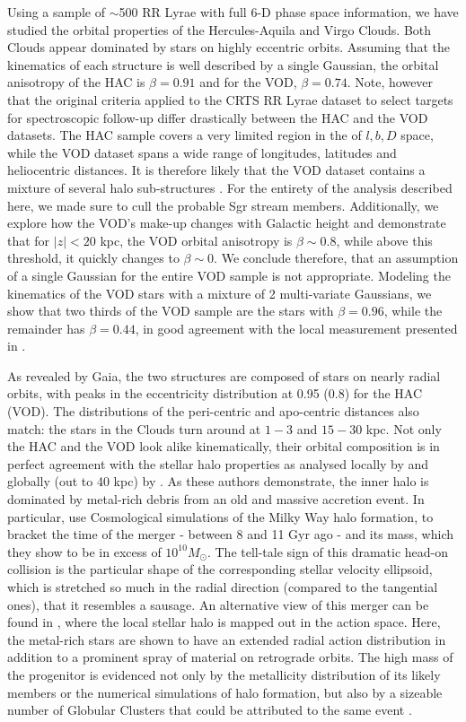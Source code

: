 \documentclass[fleqn,usenatbib]{mnras}
\begin{document}
Using a sample of $\sim$500 RR Lyrae with full 6-D phase space
information, we have studied the orbital properties of the
Hercules-Aquila and Virgo Clouds. Both Clouds appear dominated by
stars on highly eccentric orbits. Assuming that the kinematics of each
structure is well described by a single Gaussian, the orbital
anisotropy of the HAC is $\beta=0.91$ and for the VOD,
$\beta=0.74$. Note, however that the original criteria applied to the
CRTS RR Lyrae dataset to select targets for spectroscopic follow-up
differ drastically between the HAC and the VOD datasets. The HAC
sample covers a very limited region in the of $l,b, D$ space, while
the VOD dataset spans a wide range of longitudes, latitudes and
heliocentric distances. It is therefore likely that the VOD dataset
contains a mixture of several halo sub-structures \citep[see][for a
  detailed discussion]{Vivas2016}. For the entirety of the analysis
described here, we made sure to cull the probable Sgr stream
members. Additionally, we explore how the VOD's make-up changes with
Galactic height and demonstrate that for $|z|<20$ kpc, the VOD orbital
anisotropy is $\beta\sim 0.8$, while above this threshold, it quickly
changes to $\beta\sim0$. We conclude therefore, that an assumption of
a single Gaussian for the entire VOD sample is not
appropriate. Modeling the kinematics of the VOD stars with a mixture
of 2 multi-variate Gaussians, we show that two thirds of the VOD
sample are the stars with $\beta=0.96$, while the remainder has
$\beta=0.44$, in good agreement with the local measurement presented
in \citet{Belokurov2018}.

As revealed by Gaia, the two structures are composed of stars on
nearly radial orbits, with peaks in the eccentricity distribution at
0.95 (0.8) for the HAC (VOD). The distributions of the peri-centric
and apo-centric distances also match: the stars in the Clouds turn
around at $1-3$ and $15-30$ kpc. Not only the HAC and the VOD look
alike kinematically, their orbital composition is in perfect agreement
with the stellar halo properties as analysed locally by
\citet{Belokurov2018} and globally (out to 40 kpc) by
\citet{Deason2018pileup}. As these authors demonstrate, the inner halo
is dominated by metal-rich debris from an old and massive accretion
event. In particular, \citet{Belokurov2018} use Cosmological
simulations of the Milky Way halo formation, to bracket the time of
the merger - between 8 and 11 Gyr ago - and its mass, which they show
to be in excess of $10^{10} M_{\odot}$. The tell-tale sign of this
dramatic head-on collision is the particular shape of the
corresponding stellar velocity ellipsoid, which is stretched so much
in the radial direction (compared to the tangential ones), that it
resembles a sausage. An alternative view of this merger can be found
in \citet{actionhalo}, where the local stellar halo is mapped out in
the action space. Here, the metal-rich stars are shown to have an
extended radial action distribution in addition to a prominent spray
of material on retrograde orbits. The high mass of the progenitor is
evidenced not only by the metallicity distribution of its likely
members or the numerical simulations of halo formation, but also by a
sizeable number of Globular Clusters that could be attributed to the
same event \citep[see][]{sausagegc}.
\end{document}
